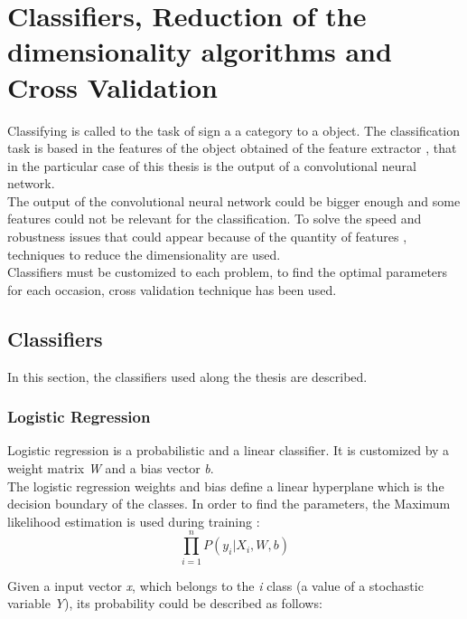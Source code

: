 \section{Classifiers, Reduction of the dimensionality algorithms and Cross Validation}
Classifying is called to the task of sign a a category to a object. The classification task is based in the features of the object obtained of the feature extractor \cite{Duda}, that in the particular case of this thesis is the output of a convolutional neural network.\\

The output of the convolutional neural network could be bigger enough and some features could not be relevant for the classification. To solve the speed and robustness issues that could appear because of the quantity of features \cite{PCAvsLDA}, techniques to reduce the dimensionality are used.\\

Classifiers must be customized to each problem, to find the optimal parameters for each occasion, cross validation technique has been used.\\

\subsection{Classifiers}
In this section, the classifiers used along the thesis are described.\\

\subsubsection{Logistic Regression}
Logistic regression is a probabilistic and a linear classifier. It is customized by a weight matrix \textit{W} and a bias vector \textit{b}.\\

The logistic regression weights and bias define a linear hyperplane which is the decision boundary of the classes. In order to find the parameters, the Maximum likelihood estimation is used during training \cite{ClassifiersReview}:\\

\begin{equation}
\prod_{i=1}^{n}P(y_i|X_i,W,b)
\end{equation}

Given a input vector \textit{x}, which belongs to the \textit{i} class (a value of a stochastic variable \textit{Y}), its probability could be described as follows:

